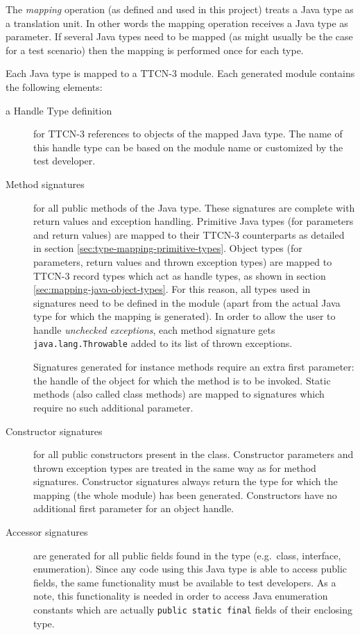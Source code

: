 The \emph{mapping} operation (as defined and used in this project)
treats a Java type as a translation unit.
In other words the mapping operation receives a Java type as parameter.
If several Java types need to be mapped
(as might usually be the case for a test scenario)
then the mapping is performed once for each type.

Each Java type is mapped to a \ac{TTCN-3} module.
Each generated module contains the following elements:

\begin{description}

\item[a Handle Type definition]
for \ac{TTCN-3} references to objects of the mapped Java type.
The name of this handle type can be based on the module name
or customized by the test developer.
\item[Method signatures]
for all public methods of the Java type.
These signatures are complete with return values and exception handling.
Primitive Java types (for parameters and return values)
are mapped to their \ac{TTCN-3} counterparts as detailed in
section \ref{sec:type-mapping-primitive-types}.
Object types (for parameters, return values and thrown exception types)
are mapped to \ac{TTCN-3} record types which act as handle types,
as shown in section \ref{sec:mapping-java-object-types}.
For this reason, all types used in signatures need to be defined in the module
(apart from the actual Java type for which the mapping is generated).
In order to allow the user to handle \emph{unchecked exceptions},
each method signature gets \texttt{java.lang.Throwable}
added to its list of thrown exceptions.

Signatures generated for instance methods require an extra first parameter:
the handle of the object for which the method is to be invoked.
Static methods (also called class methods) are mapped to signatures
which require no such additional parameter.

\item[Constructor signatures]
for all public constructors present in the class.
Constructor parameters and thrown exception types
are treated in the same way as for method signatures.
Constructor signatures always return the type
for which the mapping (the whole module) has been generated.
Constructors have no additional first parameter for an object handle.

\item[Accessor signatures]
are generated for all public fields found in the type
(e.g.\ class, interface, enumeration).
Since any code using this Java type is able to access public fields,
the same functionality must be available to test developers.
As a note, this functionality is needed
in order to access Java enumeration constants
which are actually \texttt{public static final} fields of their enclosing type.


\end{description}
